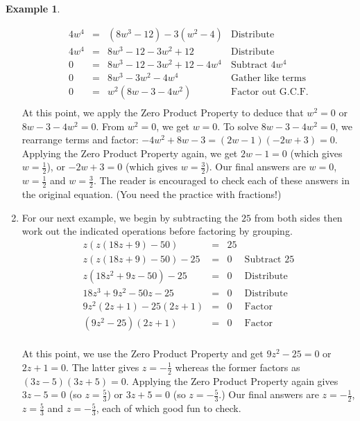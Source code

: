 \documentclass[11pt]{article}
\theoremstyle{definition}  %
\newtheorem{ex}{\bf Example}
\begin{document}
\begin{ex}
\begin{enumerate}
\[\begin{array}{rclr}
4w^4 & = & (8w^3 - 12) - 3(w^2-4) & \text{Distribute} \\
4w^4 & = & 8w^3 - 12 - 3w^2 + 12 & \text{Distribute} \\

0 & = & 8w^3 - 12 - 3w^2 + 12  - 4w^4 & \text{Subtract $4w^4$} \\
0 & = & 8w^3  - 3w^2 - 4w^4 & \text{Gather like terms} \\
0 & = & w^2(8w - 3 - 4w^2) & \text{Factor out G.C.F.} \\ \end{array} \] At this point, we  apply the Zero Product Property to deduce that $w^2 = 0$ or $8w - 3 - 4w^2 = 0$. From $w^2 = 0$, we get $w = 0$. To solve $8w - 3 - 4w^2 = 0$, we rearrange terms and factor:  $-4w^2 + 8w - 3= (2w - 1)(-2w+3) = 0$.  Applying the Zero Product Property again, we get $2w - 1= 0$ (which gives $w = \frac{1}{2}$), or $-2w+3 = 0$ (which gives $w = \frac{3}{2}$).  Our final answers are $w = 0$, $w = \frac{1}{2}$ and $w = \frac{3}{2}$.  The reader is encouraged to check each of these answers in the original equation.  (You need the practice with fractions!)

\item  For our next example, we begin by subtracting the $25$ from both sides then work out the indicated operations before factoring by grouping.\[ \begin{array}{rclr}

z(z(18z+9)-50) & = & 25 & \\

z(z(18z+9)-50) - 25 & = & 0 & \text{Subtract $25$} \\
z(18z^2 + 9z - 50) - 25 & = & 0 & \text{Distribute} \\
18z^3 + 9z^2 - 50z - 25 & = & 0 & \text{Distribute} \\

9z^2(2z + 1) - 25(2z + 1) & = & 0 & \text{Factor} \\

(9z^2 - 25)(2z+1) & = & 0 & \text{Factor} \\ \end{array} \]

At this point, we use the Zero Product Property and get $9z^2 - 25 = 0$ or $2z + 1 = 0$.  The latter gives $z = -\frac{1}{2}$ whereas the former  factors as $(3z - 5)(3z+5) = 0$.  Applying the Zero Product Property again gives $3z-5 = 0$ (so $z = \frac{5}{3}$) or $3z+5 = 0$ (so $z = -\frac{5}{3}$.) Our final answers are $z = -\frac{1}{2}$,  $z = \frac{5}{3}$ and $z = -\frac{5}{3}$, each of which good fun to check.


\end{enumerate}
\end{ex}
\end{document}
